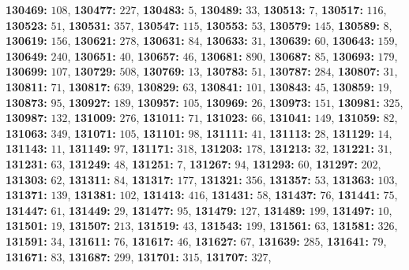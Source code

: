 \textsf{\bfseries 130469:} $108$, \textsf{\bfseries 130477:} $227$, \textsf{\bfseries 130483:} $5$, \textsf{\bfseries 130489:} $33$, \textsf{\bfseries 130513:} $7$, \textsf{\bfseries 130517:} $116$, \textsf{\bfseries 130523:} $51$, \textsf{\bfseries 130531:} $357$, \textsf{\bfseries 130547:} $115$, \textsf{\bfseries 130553:} $53$, \textsf{\bfseries 130579:} $145$, \textsf{\bfseries 130589:} $8$, \textsf{\bfseries 130619:} $156$, \textsf{\bfseries 130621:} $278$, \textsf{\bfseries 130631:} $84$, \textsf{\bfseries 130633:} $31$, \textsf{\bfseries 130639:} $60$, \textsf{\bfseries 130643:} $159$, \textsf{\bfseries 130649:} $240$, \textsf{\bfseries 130651:} $40$, \textsf{\bfseries 130657:} $46$, \textsf{\bfseries 130681:} $890$, \textsf{\bfseries 130687:} $85$, \textsf{\bfseries 130693:} $179$, \textsf{\bfseries 130699:} $107$, \textsf{\bfseries 130729:} $508$, \textsf{\bfseries 130769:} $13$, \textsf{\bfseries 130783:} $51$, \textsf{\bfseries 130787:} $284$, \textsf{\bfseries 130807:} $31$, \textsf{\bfseries 130811:} $71$, \textsf{\bfseries 130817:} $639$, \textsf{\bfseries 130829:} $63$, \textsf{\bfseries 130841:} $101$, \textsf{\bfseries 130843:} $45$, \textsf{\bfseries 130859:} $19$, \textsf{\bfseries 130873:} $95$, \textsf{\bfseries 130927:} $189$, \textsf{\bfseries 130957:} $105$, \textsf{\bfseries 130969:} $26$, \textsf{\bfseries 130973:} $151$, \textsf{\bfseries 130981:} $325$, \textsf{\bfseries 130987:} $132$, \textsf{\bfseries 131009:} $276$, \textsf{\bfseries 131011:} $71$, \textsf{\bfseries 131023:} $66$, \textsf{\bfseries 131041:} $149$, \textsf{\bfseries 131059:} $82$, \textsf{\bfseries 131063:} $349$, \textsf{\bfseries 131071:} $105$, \textsf{\bfseries 131101:} $98$, \textsf{\bfseries 131111:} $41$, \textsf{\bfseries 131113:} $28$, \textsf{\bfseries 131129:} $14$, \textsf{\bfseries 131143:} $11$, \textsf{\bfseries 131149:} $97$, \textsf{\bfseries 131171:} $318$, \textsf{\bfseries 131203:} $178$, \textsf{\bfseries 131213:} $32$, \textsf{\bfseries 131221:} $31$, \textsf{\bfseries 131231:} $63$, \textsf{\bfseries 131249:} $48$, \textsf{\bfseries 131251:} $7$, \textsf{\bfseries 131267:} $94$, \textsf{\bfseries 131293:} $60$, \textsf{\bfseries 131297:} $202$, \textsf{\bfseries 131303:} $62$, \textsf{\bfseries 131311:} $84$, \textsf{\bfseries 131317:} $177$, \textsf{\bfseries 131321:} $356$, \textsf{\bfseries 131357:} $53$, \textsf{\bfseries 131363:} $103$, \textsf{\bfseries 131371:} $139$, \textsf{\bfseries 131381:} $102$, \textsf{\bfseries 131413:} $416$, \textsf{\bfseries 131431:} $58$, \textsf{\bfseries 131437:} $76$, \textsf{\bfseries 131441:} $75$, \textsf{\bfseries 131447:} $61$, \textsf{\bfseries 131449:} $29$, \textsf{\bfseries 131477:} $95$, \textsf{\bfseries 131479:} $127$, \textsf{\bfseries 131489:} $199$, \textsf{\bfseries 131497:} $10$, \textsf{\bfseries 131501:} $19$, \textsf{\bfseries 131507:} $213$, \textsf{\bfseries 131519:} $43$, \textsf{\bfseries 131543:} $199$, \textsf{\bfseries 131561:} $63$, \textsf{\bfseries 131581:} $326$, \textsf{\bfseries 131591:} $34$, \textsf{\bfseries 131611:} $76$, \textsf{\bfseries 131617:} $46$, \textsf{\bfseries 131627:} $67$, \textsf{\bfseries 131639:} $285$, \textsf{\bfseries 131641:} $79$, \textsf{\bfseries 131671:} $83$, \textsf{\bfseries 131687:} $299$, \textsf{\bfseries 131701:} $315$, \textsf{\bfseries 131707:} $327$, 
